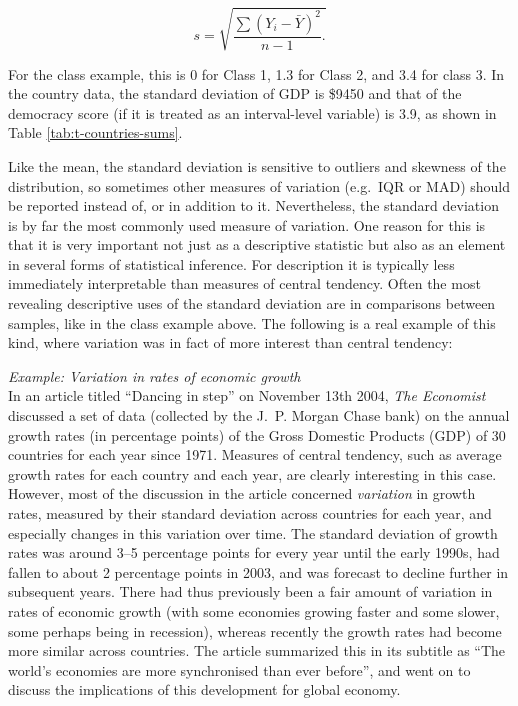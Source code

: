 \documentclass[11pt,a4paper,openany]{book}
\begin{document}
\begin{equation}s = \sqrt{\frac{\sum (Y_{i}-\bar{Y})^{2}}{n-1}.}
\label{eq:sd}\end{equation}

For the class example, this is 0 for Class 1, 1.3 for Class 2, and 3.4
for class 3. In the country data, the standard deviation of GDP is
\$9450 and that of the democracy score (if it is treated as an
interval-level variable) is 3.9, as shown in Table
\ref{tab:t-countries-sums}.

Like the mean, the standard deviation is sensitive to outliers and
skewness of the distribution, so sometimes other measures of variation
(e.g.~IQR or MAD) should be reported instead of, or in addition to it.
Nevertheless, the standard deviation is by far the most commonly used
measure of variation. One reason for this is that it is very important
not just as a descriptive statistic but also as an element in several
forms of statistical inference. For description it is typically less
immediately interpretable than measures of central tendency. Often the
most revealing descriptive uses of the standard deviation are in
comparisons between samples, like in the class example above. The
following is a real example of this kind, where variation was in fact of
more interest than central tendency:

\emph{Example: Variation in rates of economic growth}\\
In an article titled ``Dancing in step'' on November 13th 2004,
\emph{The Economist} discussed a set of data (collected by the J.~P.
Morgan Chase bank) on the annual growth rates (in percentage points) of
the Gross Domestic Products (GDP) of 30 countries for each year since
1971. Measures of central tendency, such as average growth rates for
each country and each year, are clearly interesting in this case.
However, most of the discussion in the article concerned
\emph{variation} in growth rates, measured by their standard deviation
across countries for each year, and especially changes in this variation
over time. The standard deviation of growth rates was around 3--5
percentage points for every year until the early 1990s, had fallen to
about 2 percentage points in 2003, and was forecast to decline further
in subsequent years. There had thus previously been a fair amount of
variation in rates of economic growth (with some economies growing
faster and some slower, some perhaps being in recession), whereas
recently the growth rates had become more similar across countries. The
article summarized this in its subtitle as ``The world's economies are
more synchronised than ever before'', and went on to discuss the
implications of this development for global economy.
\end{document}
